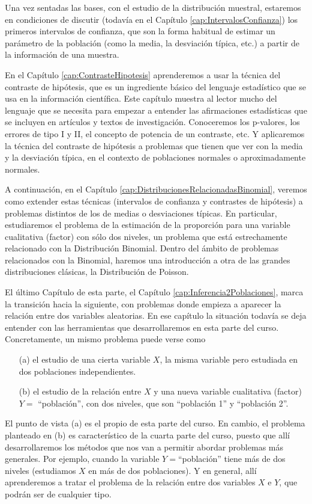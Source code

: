 Una vez sentadas las bases, con el estudio de la distribución muestral, estaremos en condiciones de discutir (todavía en el Capítulo \ref{cap:IntervalosConfianza}) los primeros {\sf intervalos de confianza}, que son la forma habitual de estimar un parámetro de la población (como la media, la desviación típica, etc.) a partir de la información de una muestra.

En el Capítulo \ref{cap:ContrasteHipotesis} aprenderemos a usar la técnica del {\sf contraste de hipótesis}, que es un ingrediente básico del lenguaje estadístico que se usa en la información científica. Este capítulo muestra al lector mucho del lenguaje que se necesita para empezar a entender las afirmaciones estadísticas que se incluyen en artículos y textos de investigación. Conoceremos los p-valores, los errores de tipo I y II, el concepto de potencia de un contraste, etc. Y aplicaremos la técnica del contraste de hipótesis a problemas que tienen que ver con la media y la desviación típica, en el contexto de poblaciones normales o aproximadamente normales.

A continuación, en el Capítulo \ref{cap:DistribucionesRelacionadasBinomial}, veremos como extender estas técnicas (intervalos de confianza y contrastes de hipótesis) a problemas distintos de los de medias o desviaciones típicas. En particular, estudiaremos el problema de la estimación de la {\sf proporción} para una variable cualitativa (factor) con sólo dos niveles, un problema que está estrechamente relacionado con la Distribución Binomial. Dentro del ámbito de problemas relacionados con la Binomial, haremos una
introducción a otra de las grandes distribuciones clásicas, la {\sf Distribución de Poisson}.

El último Capítulo de esta parte, el Capítulo \ref{cap:Inferencia2Poblaciones}, marca la transición hacia la siguiente, con problemas donde empieza a aparecer la relación entre dos variables aleatorias. En ese capítulo la situación todavía se deja entender con las herramientas que desarrollaremos en  esta parte del curso. Concretamente, un mismo problema puede verse como
\begin{itemize}
  \item[(a)] el estudio de una cierta variable $X$, la misma variable pero estudiada en dos poblaciones independientes.
  \item[(b)] el estudio de la relación entre $X$ y una nueva variable cualitativa (factor) $Y=$ ``población'', con dos niveles, que son ``población 1'' y ``población 2''.
\end{itemize}
El punto de vista (a) es el propio de esta parte del curso. En cambio, el problema planteado en (b) es característico de la cuarta parte del curso, puesto que allí desarrollaremos los métodos que nos van a permitir abordar problemas más generales. Por ejemplo, cuando la variable $Y=$``población'' tiene más de dos niveles (estudiamos $X$ en más de dos poblaciones). Y en general, allí aprenderemos a tratar el problema de la relación entre dos variables $X$ e $Y$, que podrán ser de  cualquier tipo.  
